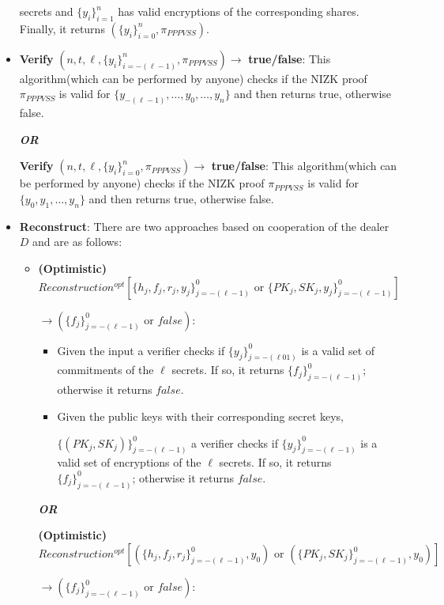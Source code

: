 \begin{definition}
\begin{itemize}
          secrets and $\{y_i\}_{i=1}^n$ has valid encryptions of the corresponding shares. Finally, it returns $(\{y_i\}_{i=0}^n,\pi_{PPPVSS})$.
        \item \textbf{Verify} $(n,t,\ell,\{y_i\}_{i=-(\ell-1)}^n,\pi_{PPPVSS})\rightarrow$ \textbf{true/false}: 
          This algorithm(which can be performed by anyone) checks if the NIZK proof $\pi_{PPPVSS}$ is valid for 
          $\{y_{-(\ell-1)},\dots,y_0,\dots,y_n\}$ and then returns true, otherwise false.\par
          \textit{\textbf{OR}}\par
          \textbf{Verify} $(n,t,\ell,\{y_i\}_{i=0}^n,\pi_{PPPVSS})\rightarrow$ \textbf{true/false}: 
          This algorithm(which can be performed by anyone) checks if the NIZK proof $\pi_{PPPVSS}$ is valid for 
          $\{y_0,y_1,\dots,y_n\}$ and then returns true, otherwise false.
        \item \textbf{Reconstruct}: There are two approaches based on cooperation of the dealer $D$ and are as follows:
          \begin{itemize}
            \item \textbf{(Optimistic)} $Reconstruction^{opt}[\{h_j,f_j,r_j,y_j\}_{j=-(\ell-1)}^0\text{ or }\{PK_j,SK_j,y_j\}_{j=-(\ell-1)}^0]$\par$\rightarrow(\{f_j\}_{j=-(\ell-1)}^0\text{ or }false)$:
              \begin{itemize}
                \item Given the input a verifier checks if $\{y_j\}_{j=-(\ell01)}^0$ is a valid set of commitments of the $\ell$ secrets. 
                 If so, it returns $\{f_j\}_{j=-(\ell-1)}^0$; otherwise it returns $false$.
                \item Given the public keys with their corresponding secret keys,\par $\{(PK_j,SK_j)\}_{j=-(\ell-1)}^0$ 
                 a verifier checks if $\{y_j\}_{j=-(\ell-1)}^0$ is a valid set of encryptions of the $\ell$ secrets. 
                 If so, it returns $\{f_j\}_{j=-(\ell-1)}^0$; otherwise it returns $false$.
              \end{itemize}\par
              \textit{\textbf{OR}}\par
              \textbf{(Optimistic)} $Reconstruction^{opt}[(\{h_j,f_j,r_j\}_{j=-(\ell-1)}^0,y_0)\text{ or }(\{PK_j,SK_j\}_{j=-(\ell-1)}^0,y_0)]$\par$\rightarrow(\{f_j\}_{j=-(\ell-1)}^0\text{ or }false)$:

\end{itemize}
\end{itemize}
\end{definition}
